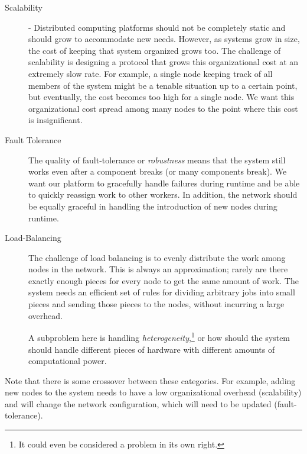 \begin{description}
	\item[Scalability] - Distributed computing platforms should not be completely static and should grow to accommodate new needs.
	However, as systems grow in size, the cost of keeping that system organized grows too.
	The challenge of scalability is designing a protocol that grows this organizational cost at an extremely slow rate.
	For example, a single node keeping track of all members of the system might be a tenable situation up to a certain point, but eventually, the cost becomes too high for a single node.
	We want this organizational cost spread among many nodes to the point where this cost is insignificant. %
	\item[Fault Tolerance]  
	The quality of fault-tolerance or \textit{robustness} means that the system still works even after a component breaks (or many components break).
	We want our platform to gracefully handle failures during runtime and be able to quickly reassign work to other workers.
	In addition, the network should be equally graceful in handling the introduction of new nodes during runtime.
	
	\item[Load-Balancing]
	The challenge of load balancing is to evenly distribute the work among nodes in the network.
	This is always an approximation; rarely  are there exactly enough pieces for  every node to get the same amount of work.
	The system needs an efficient set of rules for dividing arbitrary jobs into small pieces and sending those pieces to the nodes, without incurring a large overhead.
	
	A subproblem here is handling \textit{heterogeneity},\footnote{It could even be considered a problem in its own right.} or how should the system should handle different pieces of hardware with different amounts of computational power.
	
	
\end{description}
Note that there is some crossover between these categories. 
For example, adding new nodes to the system needs to have a low organizational overhead (scalability) and will change the network configuration, which will need to be updated (fault-tolerance).




